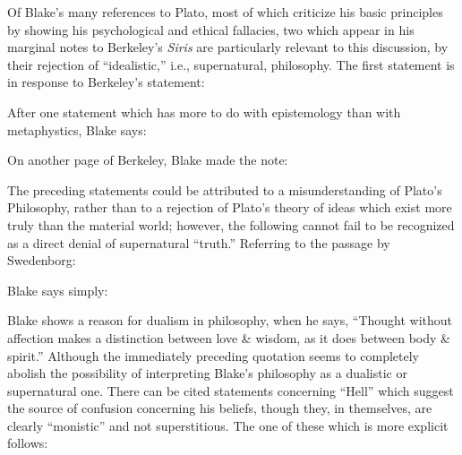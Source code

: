 Of Blake's many references to Plato, most of which criticize his basic principles by showing his psychological
and ethical fallacies, two which appear in his marginal notes to Berkeley's \emph{Siris} are particularly
relevant to this discussion, by their rejection of \enquote{idealistic,} i.e., supernatural, philosophy. The first statement
is in response to Berkeley's statement:


After one statement which has more to do with epistemology than with metaphystics, Blake says:


On another page of Berkeley, Blake made the note:


The preceding statements could be attributed to a misunderstanding of Plato's Philosophy, rather than to a rejection
of Plato's theory of ideas which exist more truly than the material world; however, the following cannot fail to be
recognized as a direct denial of supernatural \enquote{truth.} Referring to the passage by Swedenborg:


\noindent Blake says simply:


Blake shows a reason for dualism in philosophy, when he says, \enquote{Thought without affection makes a distinction
between love \& wisdom, as it does between body \& spirit.}\supercite{keynes:william-blake}
Although the immediately preceding quotation seems to completely abolish the possibility of interpreting
Blake's philosophy as a dualistic or supernatural one. There can be cited statements
concerning \enquote{Hell} which suggest the source of confusion concerning his beliefs,
though they, in themselves, are clearly \enquote{monistic} and not superstitious. The one of these which
is more explicit follows:

